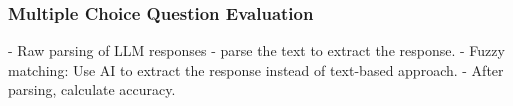 
\subsubsection{Multiple Choice Question Evaluation}
- Raw parsing of LLM responses - parse the text to extract the response.
- Fuzzy matching: Use AI to extract the response instead of text-based approach.
- After parsing, calculate accuracy.

